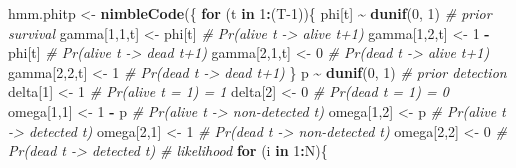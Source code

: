 \documentclass[
  12pt,
]{krantz}
\newenvironment{Shaded}{\begin{snugshade}}{\end{snugshade}}
\newcommand{\CommentTok}[1]{\textcolor[rgb]{0.56,0.35,0.01}{\textit{#1}}}
\newcommand{\ControlFlowTok}[1]{\textcolor[rgb]{0.13,0.29,0.53}{\textbf{#1}}}
\newcommand{\DecValTok}[1]{\textcolor[rgb]{0.00,0.00,0.81}{#1}}
\newcommand{\FunctionTok}[1]{\textcolor[rgb]{0.13,0.29,0.53}{\textbf{#1}}}
\newcommand{\NormalTok}[1]{#1}
\newcommand{\OtherTok}[1]{\textcolor[rgb]{0.56,0.35,0.01}{#1}}
\newcommand{\SpecialCharTok}[1]{\textcolor[rgb]{0.81,0.36,0.00}{\textbf{#1}}}
\begin{document}
\begin{Shaded}
\begin{Highlighting}[]
\NormalTok{hmm.phitp }\OtherTok{\textless{}{-}} \FunctionTok{nimbleCode}\NormalTok{(\{}
  \ControlFlowTok{for}\NormalTok{ (t }\ControlFlowTok{in} \DecValTok{1}\SpecialCharTok{:}\NormalTok{(T}\DecValTok{{-}1}\NormalTok{))\{}
\NormalTok{    phi[t] }\SpecialCharTok{\textasciitilde{}} \FunctionTok{dunif}\NormalTok{(}\DecValTok{0}\NormalTok{, }\DecValTok{1}\NormalTok{)        }\CommentTok{\# prior survival}
\NormalTok{    gamma[}\DecValTok{1}\NormalTok{,}\DecValTok{1}\NormalTok{,t] }\OtherTok{\textless{}{-}}\NormalTok{ phi[t]      }\CommentTok{\# Pr(alive t {-}\textgreater{} alive t+1)}
\NormalTok{    gamma[}\DecValTok{1}\NormalTok{,}\DecValTok{2}\NormalTok{,t] }\OtherTok{\textless{}{-}} \DecValTok{1} \SpecialCharTok{{-}}\NormalTok{ phi[t]  }\CommentTok{\# Pr(alive t {-}\textgreater{} dead t+1)}
\NormalTok{    gamma[}\DecValTok{2}\NormalTok{,}\DecValTok{1}\NormalTok{,t] }\OtherTok{\textless{}{-}} \DecValTok{0}           \CommentTok{\# Pr(dead t {-}\textgreater{} alive t+1)}
\NormalTok{    gamma[}\DecValTok{2}\NormalTok{,}\DecValTok{2}\NormalTok{,t] }\OtherTok{\textless{}{-}} \DecValTok{1}           \CommentTok{\# Pr(dead t {-}\textgreater{} dead t+1)}
\NormalTok{  \}}
\NormalTok{  p }\SpecialCharTok{\textasciitilde{}} \FunctionTok{dunif}\NormalTok{(}\DecValTok{0}\NormalTok{, }\DecValTok{1}\NormalTok{) }\CommentTok{\# prior detection}
\NormalTok{  delta[}\DecValTok{1}\NormalTok{] }\OtherTok{\textless{}{-}} \DecValTok{1}          \CommentTok{\# Pr(alive t = 1) = 1}
\NormalTok{  delta[}\DecValTok{2}\NormalTok{] }\OtherTok{\textless{}{-}} \DecValTok{0}          \CommentTok{\# Pr(dead t = 1) = 0}
\NormalTok{  omega[}\DecValTok{1}\NormalTok{,}\DecValTok{1}\NormalTok{] }\OtherTok{\textless{}{-}} \DecValTok{1} \SpecialCharTok{{-}}\NormalTok{ p    }\CommentTok{\# Pr(alive t {-}\textgreater{} non{-}detected t)}
\NormalTok{  omega[}\DecValTok{1}\NormalTok{,}\DecValTok{2}\NormalTok{] }\OtherTok{\textless{}{-}}\NormalTok{ p        }\CommentTok{\# Pr(alive t {-}\textgreater{} detected t)}
\NormalTok{  omega[}\DecValTok{2}\NormalTok{,}\DecValTok{1}\NormalTok{] }\OtherTok{\textless{}{-}} \DecValTok{1}        \CommentTok{\# Pr(dead t {-}\textgreater{} non{-}detected t)}
\NormalTok{  omega[}\DecValTok{2}\NormalTok{,}\DecValTok{2}\NormalTok{] }\OtherTok{\textless{}{-}} \DecValTok{0}        \CommentTok{\# Pr(dead t {-}\textgreater{} detected t)}
  \CommentTok{\# likelihood}
  \ControlFlowTok{for}\NormalTok{ (i }\ControlFlowTok{in} \DecValTok{1}\SpecialCharTok{:}\NormalTok{N)\{}

\end{Highlighting}
\end{Shaded}
\end{document}
